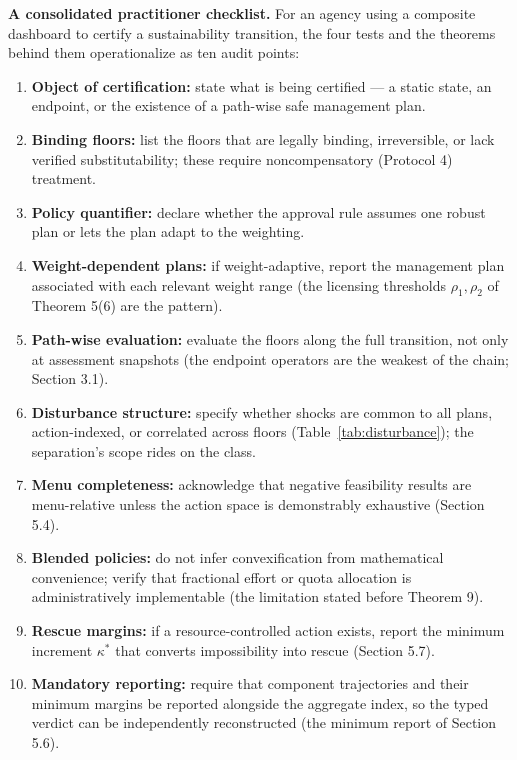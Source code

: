 \documentclass[3p,11pt]{elsarticle}
\providecommand{\tightlist}{\setlength{\itemsep}{0pt}\setlength{\parskip}{0pt}}
\begin{document}
\textbf{A consolidated practitioner checklist.} For an agency using a
composite dashboard to certify a sustainability transition, the four
tests and the theorems behind them operationalize as ten audit points:

\begin{enumerate}
\tightlist
\item
  \textbf{Object of certification:} state what is being certified --- a
  static state, an endpoint, or the existence of a path-wise safe
  management plan.
\item
  \textbf{Binding floors:} list the floors that are legally binding,
  irreversible, or lack verified substitutability; these require
  noncompensatory (Protocol 4) treatment.
\item
  \textbf{Policy quantifier:} declare whether the approval rule assumes
  one robust plan or lets the plan adapt to the weighting.
\item
  \textbf{Weight-dependent plans:} if weight-adaptive, report the
  management plan associated with each relevant weight range (the
  licensing thresholds \(\rho_1, \rho_2\) of Theorem 5(6) are the
  pattern).
\item
  \textbf{Path-wise evaluation:} evaluate the floors along the full
  transition, not only at assessment snapshots (the endpoint operators
  are the weakest of the chain; Section 3.1).
\item
  \textbf{Disturbance structure:} specify whether shocks are common to
  all plans, action-indexed, or correlated across floors
  (Table~\ref{tab:disturbance}); the separation's scope rides on the
  class.
\item
  \textbf{Menu completeness:} acknowledge that negative feasibility
  results are menu-relative unless the action space is demonstrably
  exhaustive (Section 5.4).
\item
  \textbf{Blended policies:} do not infer convexification from
  mathematical convenience; verify that fractional effort or quota
  allocation is administratively implementable (the limitation stated
  before Theorem 9).
\item
  \textbf{Rescue margins:} if a resource-controlled action exists, report
  the minimum increment \(\kappa^*\) that converts impossibility into
  rescue (Section 5.7).
\item
  \textbf{Mandatory reporting:} require that component trajectories and
  their minimum margins be reported alongside the aggregate index, so the
  typed verdict can be independently reconstructed (the minimum report of
  Section 5.6).
\end{enumerate}
\end{document}
